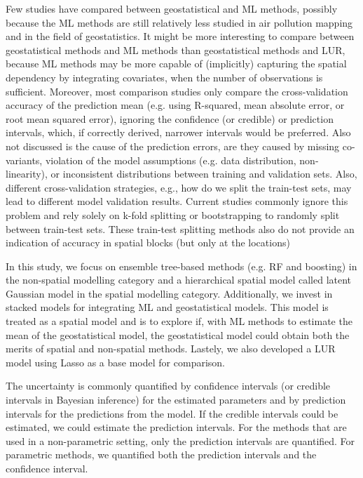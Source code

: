\documentclass{article}
\begin{document}
Few studies have compared between geostatistical and ML methods, possibly because the ML methods are still relatively less studied in air pollution mapping and in the field of geostatistics. It might be more interesting to compare between geostatistical methods and ML methods than geostatistical methods and LUR, because ML methods may be more capable of  (implicitly) capturing the spatial dependency by integrating covariates, when the number of observations is sufficient. Moreover, most comparison studies only compare the cross-validation accuracy of the prediction mean (e.g. using R-squared, mean absolute error, or root mean squared error), ignoring the confidence (or credible) or prediction intervals, which, if correctly derived, narrower intervals would be preferred.  Also not discussed is the cause of the prediction errors, are they caused by missing co-variants, violation of the model assumptions (e.g. data distribution, non-linearity), or inconsistent distributions between training and validation sets. Also, different cross-validation strategies, e.g., how do we split the train-test sets, may lead to different model validation results. Current studies commonly ignore this problem and rely solely on k-fold splitting \citep{kerckhoffs2019performance,larkin2017global,REN2020105827} or bootstrapping \citep{luglobal} to randomly split between train-test sets. These train-test splitting methods also do not provide an indication of accuracy in spatial blocks (but only at the locations)
 

In this study, we focus on ensemble tree-based methods (e.g. RF and boosting) in the non-spatial modelling category and a hierarchical spatial model \citep{lindgren2015bayesian, blangiardo2015spatial,moraga2019} called latent Gaussian model in the spatial modelling category. Additionally, we invest in stacked models for integrating ML and geostatistical models. This model is treated as a spatial model and is to explore if, with ML methods to estimate the mean of the geostatistical model, the geostatistical model could obtain both the merits of spatial and non-spatial methods. Lastely, we also developed a LUR model using Lasso as a base model for comparison.  

The uncertainty is commonly quantified by confidence intervals (or credible intervals in Bayesian inference) for the estimated parameters and by prediction intervals for the predictions from the model. If the credible intervals could be estimated, we could estimate the prediction intervals. For the methods that are used in a non-parametric setting, only the prediction intervals are quantified. For parametric methods, we quantified both the prediction intervals and the confidence interval.  
\end{document}
